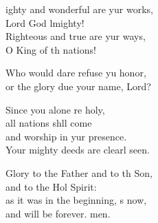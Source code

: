 \settowidth{\versewidth}{Mighty and wonderful are your works, *}
\begin{psalmverse}%
  \begin{patverse}
ighty and wonderful are yur works,\Med\\
Lord God lmighty!\\
Righteous and true are yur ways,\Med\\
O King of th nations!

Who would dare refuse yu honor,\Med\\
or the glory due your name,  Lord?

Since you alone re holy,\Med\\
all nations shll come\\
and worship in yur presence.\Med\\
Your mighty deeds are clearl seen.

Glory to the Father and to th Son,\Med\\
and to the Hol Spirit:\\
as it was in the beginning, \pointup{\i}s now,\Med\\
and will be forever. men.
  \end{patverse}
\end{psalmverse}
